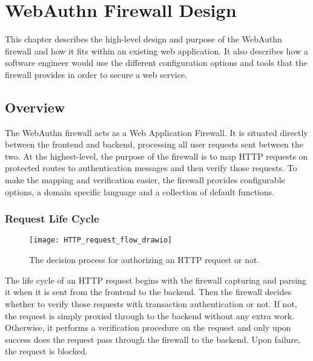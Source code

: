 \chapter{WebAuthn Firewall Design}\label{Chap:WebauthnFirewallDesign}

This chapter describes the high-level design and purpose of the WebAuthn firewall and how it fits within an existing web application. It also describes how a software engineer would use the different configuration options and tools that the firewall provides in order to secure a web service.

\section{Overview}

The WebAuthn firewall acts as a Web Application Firewall. It is situated directly between the frontend and backend, processing all user requests sent between the two. At the highest-level, the purpose of the firewall is to map HTTP requests on protected routes to authentication messages and then verify those requests. To make the mapping and verification easier, the firewall provides configurable options, a domain specific language and a collection of default functions.

\subsection{Request Life Cycle}

\begin{figure}[h]
  \centering
  \texttt{[image: HTTP\_request\_flow\_drawio]}
  \caption{The decision process for authorizing an HTTP request or not.}  
  \label{fig:xray}
\end{figure}

The life cycle of an HTTP request begins with the firewall capturing and parsing it when it is sent from the frontend to the backend. Then the firewall decides whether to verify those requests with transaction authentication or not. If not, the request is simply proxied through to the backend without any extra work. Otherwise, it performs a verification procedure on the request and only upon success does the request pass through the firewall to the backend. Upon failure, the request is blocked.

